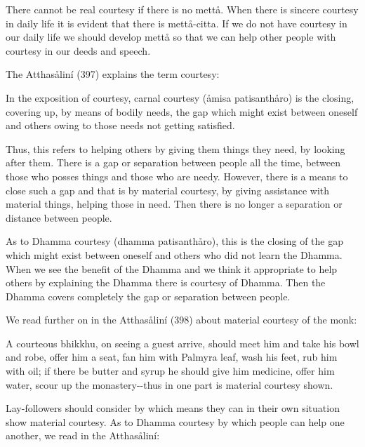 \documentclass[12pt,twoside]{article}
\begin{document}
\bigskip

There cannot be real courtesy if there is no mett{\aa}. When there is
sincere courtesy in daily life it is evident that there is
mett{\aa}{}-citta. If we do not have courtesy in our daily life we
should develop mett{\aa} so that we can help other people with courtesy
in our deeds and speech. 

The Atthas{\aa}lin\'i (397) explains the term courtesy:


\bigskip

In the exposition of courtesy, {\textasciigrave}{\textasciigrave}carnal
courtesy{\textquotesingle}{\textquotesingle} ({\aa}misa
patisanth{\aa}ro) is the closing, covering up, by means of bodily
needs, the gap which might exist between oneself and others owing to
those needs not getting satisfied. 


\bigskip

Thus, this refers to helping others by giving them things they need, by
looking after them. There is a gap or separation between people all the
time, between those who posses things and those who are needy. However,
there is a means to close such a gap and that is by material courtesy,
by giving assistance with material things, helping those in need. Then
there is no longer a separation or distance between people. 

As to {\textasciigrave}{\textasciigrave}Dhamma
courtesy{\textquotesingle}{\textquotesingle} (dhamma patisanth{\aa}ro),
this is the closing of the gap which might exist between oneself and
others who did not learn the Dhamma. When we see the benefit of the
Dhamma and we think it appropriate to help others by explaining the
Dhamma there is courtesy of Dhamma. Then the Dhamma covers completely
the gap or separation between people. 

We read further on in the Atthas{\aa}lin\'i (398) about material
courtesy of the monk:


\bigskip

A courteous bhikkhu, on seeing a guest arrive, should meet him and take
his bowl and robe, offer him a seat, fan him with Palmyra leaf, wash
his feet, rub him with oil; if there be butter and syrup he should give
him medicine, offer him water, scour up the monastery{}-{}-thus in one
part is material courtesy shown. 

Lay{}-followers should consider by which means they can in their own
situation show material courtesy. As to Dhamma courtesy by which people
can help one another, we read in the Atthas{\aa}lin\'i: 
\end{document}
